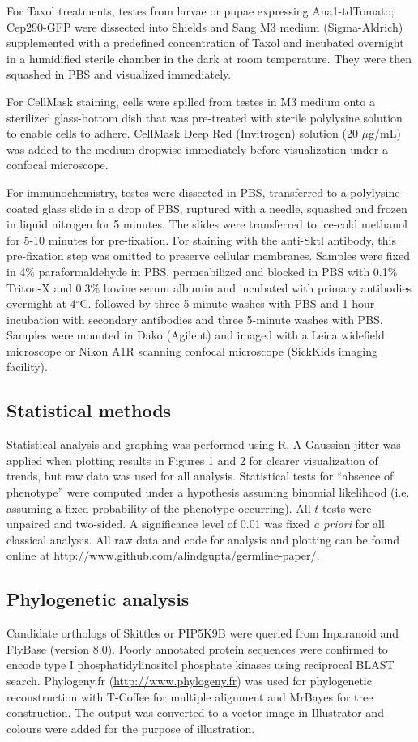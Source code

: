 \documentclass[12pt, twoside, letterpaper]{article}
\begin{document}
For Taxol treatments, testes from larvae or pupae expressing
Ana1-tdTomato; Cep290-GFP were
dissected into Shields and Sang M3 medium (Sigma-Aldrich) supplemented
with a predefined
concentration of Taxol and incubated overnight in a humidified sterile
chamber in the dark at room temperature. They were then squashed
in PBS and visualized immediately.

For CellMask staining, cells were spilled from testes in M3 medium onto
a sterilized glass-bottom dish that was pre-treated with sterile polylysine solution
to enable cells to adhere.
CellMask Deep Red (Invitrogen) solution (20 $\mu$g/mL) was added to the medium dropwise
immediately before visualization under a confocal microscope.

For immunochemistry, testes were dissected in PBS,
transferred to a polylysine-coated glass slide in a drop of PBS,
ruptured with a needle, squashed and frozen in liquid nitrogen for 5 minutes.
The slides were transferred to ice-cold methanol for 5-10 minutes for pre-fixation.
For staining with the anti-Sktl antibody, this pre-fixation step
was omitted to preserve cellular membranes.
Samples were fixed in 4\% paraformaldehyde in PBS,
permeabilized and blocked in PBS with 0.1\% Triton-X and 0.3\% bovine
serum albumin and incubated with primary antibodies overnight at 4$^{\circ}$C.
followed by three 5-minute washes with PBS and 1 hour incubation
with secondary antibodies and three 5-minute washes with PBS.
Samples were mounted in Dako (Agilent) and imaged with
a Leica widefield microscope
or Nikon A1R scanning confocal microscope (SickKids imaging facility).

\subsection{Statistical methods}
Statistical analysis and graphing was performed using R.
A Gaussian jitter was applied when plotting
results in Figures 1 and 2 for clearer visualization of trends,
but raw data was used for all analysis.
Statistical tests for ``absence of phenotype'' were computed under a
hypothesis assuming binomial likelihood (i.e. assuming a fixed probability of the
phenotype occurring).
All $t$-tests were unpaired and two-sided.
A significance level of 0.01 was fixed \textit{a priori} for all classical analysis.
All raw data and code for analysis and plotting can be found online
at \url{http://www.github.com/alindgupta/germline-paper/}.

\subsection{Phylogenetic analysis}
Candidate orthologs of Skittles or PIP5K9B were queried
from Inparanoid and FlyBase (version 8.0).
Poorly annotated protein sequences were confirmed
to encode type I phosphatidylinositol phosphate
kinases using reciprocal BLAST search.
Phylogeny.fr (\url{http://www.phylogeny.fr}) was used for
phylogenetic reconstruction with T-Coffee for multiple alignment
and MrBayes for tree construction.
The output was converted to a vector image in Illustrator
and colours were added for the purpose of illustration.
\end{document}
